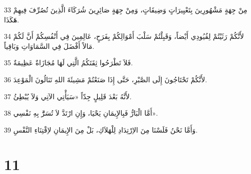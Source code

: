 \par 33 مِنْ جِهَةٍ مَشْهُورِينَ بِتَعْيِيرَاتٍ وَضِيقَاتٍ، وَمِنْ جِهَةٍ صَائِرِينَ شُرَكَاءَ الَّذِينَ تُصُرِّفَ فِيهِمْ هَكَذَا.
\par 34 لأَنَّكُمْ رَثَيْتُمْ لِقُيُودِي أَيْضاً، وَقَبِلْتُمْ سَلْبَ أَمْوَالِكُمْ بِفَرَحٍ، عَالِمِينَ فِي أَنْفُسِكُمْ أَنَّ لَكُمْ مَالاً أَفْضَلَ فِي السَّمَاوَاتِ وَبَاقِياً.
\par 35 فَلاَ تَطْرَحُوا ثِقَتَكُمُ الَّتِي لَهَا مُجَازَاةٌ عَظِيمَةٌ.
\par 36 لأَنَّكُمْ تَحْتَاجُونَ إِلَى الصَّبْرِ، حَتَّى إِذَا صَنَعْتُمْ مَشِيئَةَ اللهِ تَنَالُونَ الْمَوْعِدَ.
\par 37 لأَنَّهُ بَعْدَ قَلِيلٍ جِدّاً «سَيَأْتِي الآتِي وَلاَ يُبْطِئُ.
\par 38 أَمَّا الْبَارُّ فَبِالإِيمَانِ يَحْيَا، وَإِنِ ارْتَدَّ لاَ تُسَرَُّ بِهِ نَفْسِي».
\par 39 وَأَمَّا نَحْنُ فَلَسْنَا مِنَ الاِرْتِدَادِ لِلْهَلاَكِ، بَلْ مِنَ الإِيمَانِ لاِقْتِنَاءِ النَّفْسِ.

\chapter{11}

